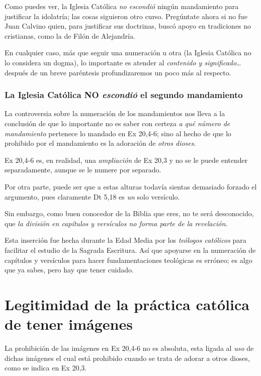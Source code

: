 \documentclass{article}
\begin{document}
\noindent
Como puedes ver, la Iglesia Cat\'olica \emph{no escondi\'o} ning\'un mandamiento para justificar la idolatr\'{i}a; las cosas siguieron otro curso. Preg\'untate ahora si no fue Juan Calvino quien, para justificar sus doctrinas, busc\'o apoyo en tradiciones no cristianas, como la de Fil\'on de Alejandr\'{i}a.

En cualquier caso, m\'as que seguir una numeraci\'on u otra (la Iglesia Cat\'olica no lo considera un dogma), lo importante es atender al \emph{contenido y significado}\ldots despu\'es de un breve par\'entesis profundizaremos un poco m\'as al respecto.

\subsubsection{La Iglesia Cat\'olica NO \emph{escondi\'o} el segundo mandamiento}
La controversia sobre la numeraci\'on de los mandamientos nos lleva a la conclusi\'on de que lo importante no es saber con certeza \emph{a qu\'e n\'umero de mandamiento} pertenece lo mandado en Ex 20,4-6; sino al hecho de que lo prohibido por el mandamiento es la adoraci\'on de \emph{otros dioses}.

Ex 20,4-6 es, en realidad, una \emph{ampliaci\'on} de Ex 20,3 y no se le puede entender separadamente, aunque se le numere por separado.

Por otra parte, puede ser que a estas alturas todav\'{i}a sientas demasiado forzado el argumento, pues claramente Dt 5,18 es \emph{un} solo vers\'{i}culo.

Sin embargo, como buen conocedor de la Biblia que eres, no te ser\'a desconocido, que \emph{la divisi\'on en cap\'{i}tulos y vers\'{i}culos no forma parte de la revelaci\'on}.

Esta inserci\'on fue hecha durante la Edad Media por los \emph{te\'ologos cat\'olicos} para facilitar el estudio de la Sagrada Escritura. As\'{i} que apoyarse en la numeraci\'on de cap\'{i}tulos y vers\'{i}culos para hacer fundamentaciones teol\'ogicas es err\'oneo; es algo que ya sabes, pero hay que tener cuidado.

\section{Legitimidad de la pr\'actica cat\'olica de tener im\'agenes}

La prohibici\'on de las im\'agenes en Ex 20,4-6 no es absoluta, esta ligada al \emph{uso} de dichas im\'agenes el cual est\'a prohibido cuando se trata de adorar a otros dioses, como se indica en Ex 20,3.
\end{document}
